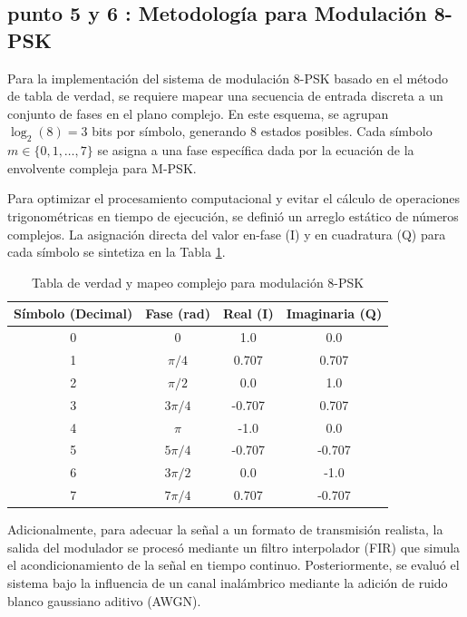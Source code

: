 \subsection*{punto 5 y 6 : Metodología para Modulación 8-PSK}

Para la implementación del sistema de modulación 8-PSK basado en el método de tabla de verdad, se requiere mapear una secuencia de entrada discreta a un conjunto de fases en el plano complejo. En este esquema, se agrupan $\log_2(8) = 3$ bits por símbolo, generando 8 estados posibles. Cada símbolo $m \in \{0, 1, \dots, 7\}$ se asigna a una fase específica dada por la ecuación de la envolvente compleja para M-PSK.

Para optimizar el procesamiento computacional y evitar el cálculo de operaciones trigonométricas en tiempo de ejecución, se definió un arreglo estático de números complejos. La asignación directa del valor en-fase (I) y en cuadratura (Q) para cada símbolo se sintetiza en la Tabla \ref{tab:verdad_8psk}.

\begin{table}[h]
    \centering
    \caption{Tabla de verdad y mapeo complejo para modulación 8-PSK}
    \begin{tabular}{|c|c|c|c|}
        \hline
        \textbf{Símbolo (Decimal)} & \textbf{Fase (rad)} & \textbf{Real (I)} & \textbf{Imaginaria (Q)} \\
        \hline
        0 & 0 & 1.0 & 0.0 \\
        1 & $\pi/4$ & 0.707 & 0.707 \\
        2 & $\pi/2$ & 0.0 & 1.0 \\
        3 & $3\pi/4$ & -0.707 & 0.707 \\
        4 & $\pi$ & -1.0 & 0.0 \\
        5 & $5\pi/4$ & -0.707 & -0.707 \\
        6 & $3\pi/2$ & 0.0 & -1.0 \\
        7 & $7\pi/4$ & 0.707 & -0.707 \\
        \hline
    \end{tabular}
    \label{tab:verdad_8psk}
\end{table}

Adicionalmente, para adecuar la señal a un formato de transmisión realista, la salida del modulador se procesó mediante un filtro interpolador (FIR) que simula el acondicionamiento de la señal en tiempo continuo. Posteriormente, se evaluó el sistema bajo la influencia de un canal inalámbrico mediante la adición de ruido blanco gaussiano aditivo (AWGN).